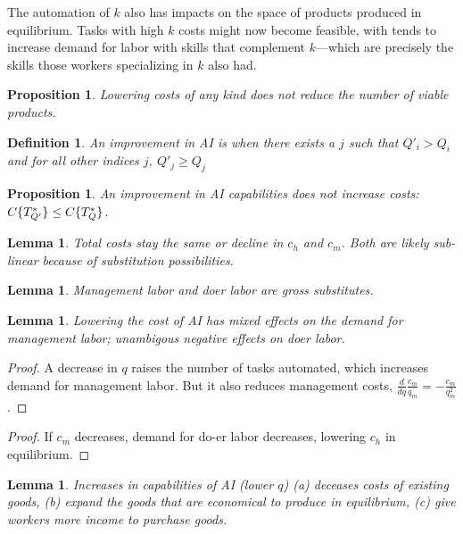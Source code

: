 \documentclass{article}
\newtheorem{proposition}[theorem]{Proposition}
\newtheorem{lemma}[theorem]{Lemma}
\newtheorem{definition}[theorem]{Definition}
\begin{document}
The automation of $k$ also has impacts on the space of products produced in equilibrium.
Tasks with high $k$ costs might now become feasible, with tends to increase demand for labor with skills that complement $k$---which are precisely the skills those workers specializing in $k$ also had. 


\begin{proposition}
Lowering costs of any kind does not reduce the number of viable products.
\end{proposition}

\begin{definition}
An improvement in AI is when there exists a $j$ such that $Q'_i > Q_i$ and for all other indices $j$, $Q'_j \ge Q_j$
\end{definition}

\begin{proposition}
An improvement in AI capabilities does not increase costs: ${C\{ T^*_{Q'} \} \le C\{ T^*_{Q} \}}$.
\end{proposition}


\begin{lemma}
  Total costs stay the same or decline in $c_h$ and $c_m$.
  Both are likely sub-linear because of substitution possibilities.
\end{lemma}

\begin{lemma}
  Management labor and doer labor are gross substitutes.
\end{lemma}

\begin{lemma}
  Lowering the cost of AI has mixed effects on the demand for management labor; unambigous negative effects on doer labor.
\end{lemma}
\begin{proof}
  A decrease in $q$ raises the number of tasks automated, which increases demand for management labor.
  But it also reduces management costs, $\frac{d}{d q} \frac{c_m}{q_m} = -\frac{c_m}{q_m^2}$.
\end{proof}

\begin{proof}
  If $c_m$ decreases, demand for do-er labor decreases, lowering $c_h$ in equilibrium.
\end{proof}

\begin{lemma}
Increases in capabilities of AI (lower $q$) (a) deceases costs of existing goods, (b) expand the goods that are economical to produce in equilibrium, (c) give workers more income to purchase goods.  
\end{lemma}
\end{document}
